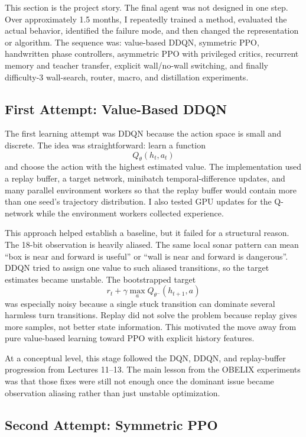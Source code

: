 \documentclass[11pt, oneside]{article}   	%
\begin{document}
This section is the project story. The final agent was not designed in one step. Over
approximately 1.5 months, I repeatedly trained a method, evaluated the actual behavior,
identified the failure mode, and then changed the representation or algorithm. The
sequence was: value-based DDQN, symmetric PPO, handwritten phase controllers,
asymmetric PPO with privileged critics, recurrent memory and teacher transfer, explicit
wall/no-wall switching, and finally difficulty-3 wall-search, router, macro, and
distillation experiments.

\subsection{First Attempt: Value-Based DDQN}

The first learning attempt was DDQN because the action space is small and discrete. The
idea was straightforward: learn a function
\[
  Q_\theta(h_t,a_t)
\]
and choose the action with the highest estimated value. The implementation used a replay
buffer, a target network, minibatch temporal-difference updates, and many parallel
environment workers so that the replay buffer would contain more than one seed's
trajectory distribution. I also tested GPU updates for the Q-network while the
environment workers collected experience.

This approach helped establish a baseline, but it failed for a structural reason. The
18-bit observation is heavily aliased. The same local sonar pattern can mean ``box is
near and forward is useful'' or ``wall is near and forward is dangerous''. DDQN tried to
assign one value to such aliased transitions, so the target estimates became unstable.
The bootstrapped target
\[
  r_t + \gamma \max_a Q_{\theta^-}(h_{t+1},a)
\]
was especially noisy because a single stuck transition can dominate several harmless
turn transitions. Replay did not solve the problem because replay gives more samples,
not better state information. This motivated the move away from pure value-based
learning toward PPO with explicit history features.

At a conceptual level, this stage followed the DQN, DDQN, and replay-buffer progression
from Lectures 11--13. The main lesson from the OBELIX experiments was that those fixes
were still not enough once the dominant issue became observation aliasing rather than
just unstable optimization.

\subsection{Second Attempt: Symmetric PPO}
\end{document}

